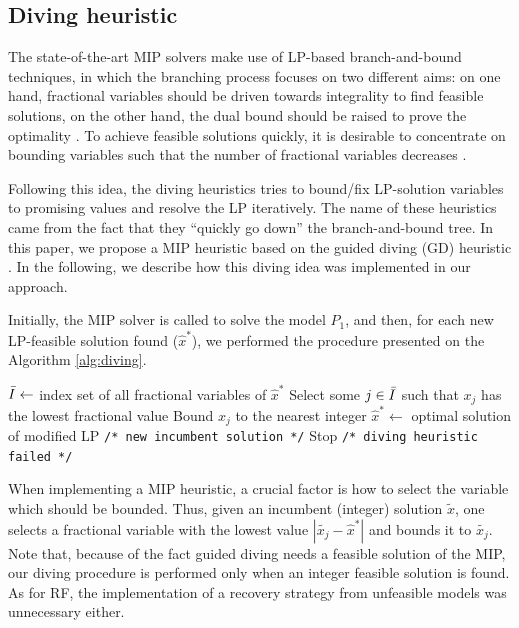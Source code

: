 \documentclass{ro}
\begin{document}
\subsection{Diving heuristic}

The state-of-the-art MIP solvers make use of  LP-based branch-and-bound techniques, in which the branching process focuses on two different aims:  on one hand, fractional variables should be driven towards integrality  to find feasible solutions, on the other hand, the dual bound should be raised  to prove the optimality \cite{achterberg2009hybrid}. To achieve feasible solutions quickly, it is desirable to concentrate on bounding variables such that the number of fractional variables decreases \cite{berthold2006primal}.

Following this idea, the diving heuristics tries  to bound/fix LP-solution variables to promising values and resolve the LP  iteratively. The name of these heuristics came from the fact that they ``quickly go down'' the branch-and-bound tree. In this paper, we propose a MIP heuristic based on the guided diving (GD) heuristic \cite{achterberg2005branching}. In the following, we describe how this diving idea was implemented in our approach.


Initially, the MIP solver is called to solve the model $P_1$, and then, for each new LP-feasible solution found ($\hat{x}^*$), we performed the procedure presented on  the Algorithm \ref{alg:diving}.



\begin{algorithm}[!h]
	\caption{\hspace{-1mm}\textbf{: Diving  }($\hat{x}^*$)}
	\label{alg:diving}
	{\footnotesize
		\begin{algorithmic}[1]	
			\STATE  $\Bar{I} \gets$ index set of all fractional variables of $\hat{x}^*$
			\STATE Select some $j \in \Bar{I}$ such that $x_j$ has the lowest fractional value
			\STATE Bound $x_j$ to the nearest integer
			\STATE $\hat{x}^* \gets $ optimal solution of modified LP \texttt{/* new incumbent solution */}
			\ELSE
			\STATE Stop \texttt{/* diving heuristic failed */}
			\ENDIF
			
		\end{algorithmic}
	}
\end{algorithm}

When implementing a MIP heuristic, a crucial factor is
how to select the variable which should be bounded. Thus,  given an incumbent (integer) solution $\tilde{x}$, one selects a fractional variable with the lowest
value $|\tilde{x_j} - \hat{x}^*|$ and bounds it to $\tilde{x_j}$. Note that, because of the fact guided diving needs a feasible solution of the MIP, our diving procedure is performed only when an integer feasible solution is found. As for RF, the implementation of a recovery strategy from unfeasible models was unnecessary either.
\end{document}
